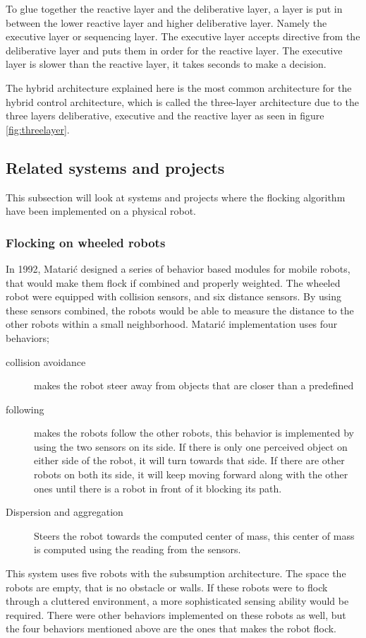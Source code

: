 To glue together the reactive layer and the deliberative layer, a layer is put in between the lower reactive layer and higher deliberative layer. Namely the executive layer or sequencing layer. The executive layer accepts directive from the deliberative layer and puts them in order for the reactive layer. The executive layer is slower than the reactive layer, it takes seconds to make a decision.

The hybrid architecture explained here is the most common architecture for the hybrid control architecture, which is called the three-layer architecture due to the three layers deliberative, executive and the reactive layer as seen in figure \ref{fig:threelayer}.


\subsection{Related systems and projects}
\label{sec:relsys}
This subsection will look at systems and projects where the flocking algorithm have been implemented on a physical robot.

\subsubsection{Flocking on wheeled robots}
In 1992, Matari\'{c} designed a series of behavior based modules for mobile robots, that would make them flock if combined and properly weighted. The wheeled robot were equipped with collision sensors, and six distance sensors. By using these sensors combined, the robots would be able to measure the distance to the other robots within a small neighborhood. Matari\'c implementation uses four behaviors;
\begin{description}
\item[collision avoidance] makes the robot steer away from objects that are closer than a predefined
\item [following] makes the robots follow the other robots, this behavior is implemented by using the two sensors on its side. If there is only one perceived object on either side of the robot, it will turn towards that side. If there are other robots on both its side, it will keep moving forward along with the other ones until there is a robot in front of it blocking its path.
\item[Dispersion and aggregation] Steers the robot towards the computed center of mass, this center of mass is computed using the reading from the sensors.
\end{description}
This system uses five robots with the subsumption architecture. The space the robots are empty, that is no obstacle or walls. If these robots were to flock through a cluttered environment, a more sophisticated sensing ability would be required. There were other behaviors implemented on these robots as well, but the four behaviors mentioned above are the ones that makes the robot flock.

